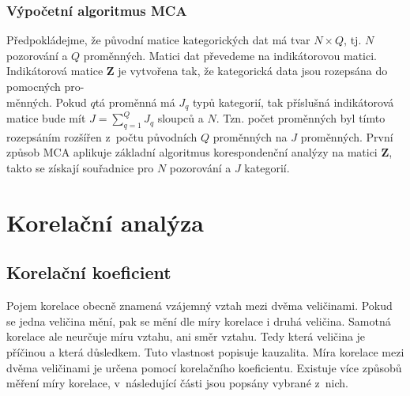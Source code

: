 \subsubsection*{Výpočetní algoritmus MCA}

Předpokládejme, že původní matice kategorických dat má tvar $N\times Q$, tj. $N$ pozorování a $Q$ proměnných. Matici dat převedeme na indikátorovou matici. Indikátorová matice  $\mathbf{Z} $ je vytvořena tak, že kategorická data jsou rozepsána do pomocných pro-\\měnných. Pokud $q$tá proměnná má $J_q$ typů kategorií, tak příslušná indikátorová matice bude mít $J = \sum_{q=1}^{Q}J_q$ sloupců a $N$. Tzn. počet proměnných byl tímto rozepsáním rozšířen z~počtu původních $Q$ proměnných na $J$ proměnných.
První způsob MCA aplikuje základní algoritmus korespondenční analýzy na matici  $\mathbf{Z}$, takto se získají souřadnice pro $N$ pozorování a $J$ kategorií.




\section{Korelační analýza}
\label{sec:Teoriekorelace}
\subsection{Korelační koeficient}

Pojem korelace obecně znamená vzájemný vztah mezi dvěma veličinami. Pokud se jedna veličina mění, pak se mění dle míry korelace i druhá veličina. Samotná korelace ale neurčuje míru vztahu, ani směr vztahu. Tedy která veličina je příčinou a která důsledkem. Tuto vlastnost popisuje kauzalita. Míra korelace mezi dvěma veličinami je určena pomocí korelačního koeficientu. Existuje více způsobů měření míry korelace, v~následující části jsou popsány vybrané z~nich.\cite{bib:MB}

